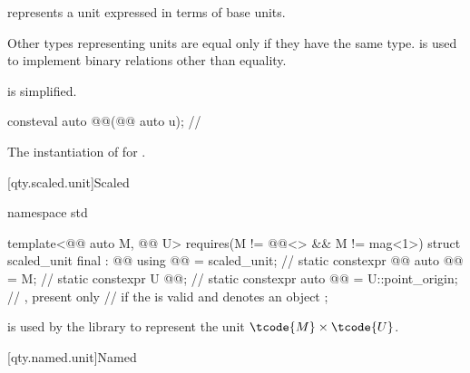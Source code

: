 \pnum
{} represents a unit expressed in terms of base units.
\begin{note}
Other types representing units are equal only if they have the same type.
 is used to implement binary relations other than equality.
\end{note}
 is simplified.

\begin{itemdecl}
consteval auto @@(@@ auto u);  // \expos
\end{itemdecl}

\begin{itemdescr}
\pnum
\returns
The instantiation of  for .
\end{itemdescr}

[qty.scaled.unit]{Scaled}

\begin{codeblock}
namespace std {

template<@@ auto M, @@ U>
  requires(M != @@<>{} && M != mag<1>)
struct scaled_unit final : @@ {
  using @@ = scaled_unit;                         // \expos
  static constexpr @@ auto @@ = M;           // \expos
  static constexpr U @@{};                   // \expos
  static constexpr auto @@ = U::point_origin;  // \expos, present only
    // if the   is valid and denotes an object
};

}
\end{codeblock}

\pnum
{} is used by the library
to represent the unit $\tcode{M} \times \tcode{U}$.

[qty.named.unit]{Named}

